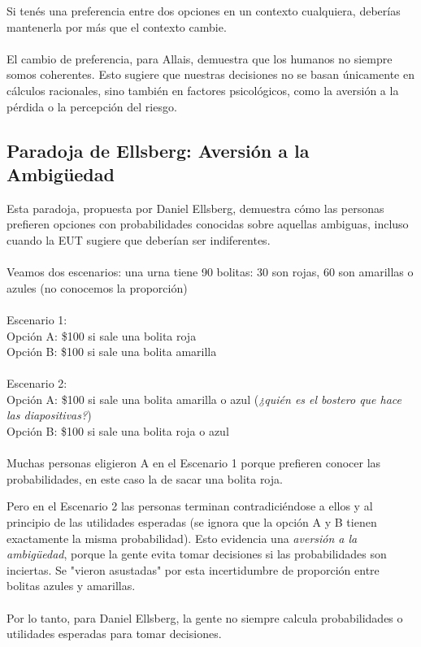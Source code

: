 \documentclass{article}
\begin{document}
            Si tenés una preferencia entre dos opciones en un contexto cualquiera, deberías mantenerla por más que el contexto cambie. \\
            \\
            El cambio de preferencia, para Allais, demuestra que los humanos no siempre somos coherentes. Esto sugiere que nuestras decisiones no se basan únicamente en cálculos racionales, sino también en factores psicológicos, como la aversión a la pérdida o la percepción del riesgo.
        \subsection*{Paradoja de Ellsberg: Aversión a la Ambigüedad}
            Esta paradoja, propuesta por Daniel Ellsberg, demuestra cómo las personas prefieren opciones con probabilidades conocidas sobre aquellas ambiguas, incluso cuando la EUT sugiere que deberían ser indiferentes. \\
            \\
            Veamos dos escenarios: una urna tiene 90 bolitas: 30 son rojas, 60 son amarillas o azules (no conocemos la proporción) \\
            \\
            Escenario 1: \\
            Opción A: \$100 si sale una bolita roja \\
            Opción B: \$100 si sale una bolita amarilla \\
            \\
            Escenario 2: \\
            Opción A: \$100 si sale una bolita amarilla o azul (\textit{¿quién es el bostero que hace las diapositivas?}) \\
            Opción B: \$100 si sale una bolita roja o azul \\
            \\
            Muchas personas eligieron A en el Escenario 1 porque prefieren conocer las probabilidades, en este caso la de sacar una bolita roja.
            
            Pero en el Escenario 2 las personas terminan contradiciéndose a ellos y al principio de las utilidades esperadas (se ignora que la opción A y B tienen exactamente la misma probabilidad). Esto evidencia una \emph{aversión a la ambigüedad}, porque la gente evita tomar decisiones si las probabilidades son inciertas. Se "vieron asustadas" por esta incertidumbre de proporción entre bolitas azules y amarillas. \\
            \\
            Por lo tanto, para Daniel Ellsberg, la gente no siempre calcula probabilidades o utilidades esperadas para tomar decisiones.
\end{document}
